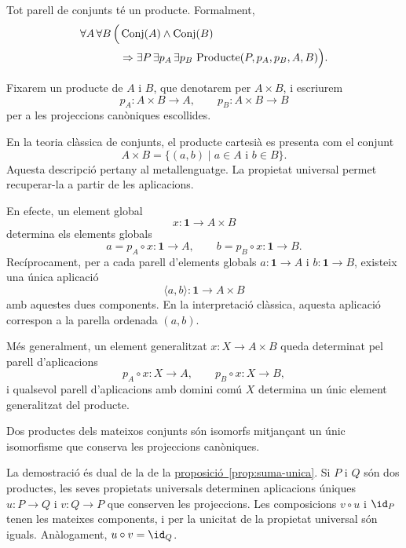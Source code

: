 \begin{axioma}\label{ax:productes}
Tot parell de conjunts té un producte. Formalment,
\[
\begin{aligned}
\forall A\,\forall B\,\Bigl(&
\operatorname{Conj}(A)\land\operatorname{Conj}(B)
\\
&{}\Rightarrow
\exists P\,\exists p_A\,\exists p_B\,
\operatorname{Producte}(P,p_A,p_B,A,B)
\Bigr).
\end{aligned}
\]
\end{axioma}

\begin{notacio}\label{not:producte-escollit}
Fixarem un producte de \(A\) i \(B\), que denotarem per \(A\times B\), i escriurem
\[
p_A:A\times B\to A,
\qquad
p_B:A\times B\to B
\]
per a les projeccions canòniques escollides.
\end{notacio}

\begin{observacio}\label{obs:parelles-ordenades}
En la teoria clàssica de conjunts, el producte cartesià es presenta com el conjunt
\[
A\times B=\{(a,b)\mid a\in A\text{ i }b\in B\}.
\]
Aquesta descripció pertany al metallenguatge. La propietat universal permet recuperar-la a partir de les aplicacions.

En efecte, un element global
\[
x:\mathbf1\to A\times B
\]
determina els elements globals
\[
a=p_A\circ x:\mathbf1\to A,
\qquad
b=p_B\circ x:\mathbf1\to B.
\]
Recíprocament, per a cada parell d'elements globals \(a:\mathbf1\to A\) i \(b:\mathbf1\to B\), existeix una única aplicació
\[
\langle a,b\rangle:\mathbf1\to A\times B
\]
amb aquestes dues components. En la interpretació clàssica, aquesta aplicació correspon a la parella ordenada \((a,b)\).

Més generalment, un element generalitzat \(x:X\to A\times B\) queda determinat pel parell d'aplicacions
\[
p_A\circ x:X\to A,
\qquad
p_B\circ x:X\to B,
\]
i qualsevol parell d'aplicacions amb domini comú \(X\) determina un únic element generalitzat del producte.
\end{observacio}

\begin{proposicio}\label{prop:producte-unic}
Dos productes dels mateixos conjunts són isomorfs mitjançant un únic isomorfisme que conserva les projeccions canòniques.
\end{proposicio}

\begin{prova}
La demostració és dual de la de la \hyperref[prop:suma-unica]{proposició~\ref*{prop:suma-unica}}. Si \(P\) i \(Q\) són dos productes, les seves propietats universals determinen aplicacions úniques \(u:P\to Q\) i \(v:Q\to P\) que conserven les projeccions. Les composicions \(v\circ u\) i \(\id_P\) tenen les mateixes components, i per la unicitat de la propietat universal són iguals. Anàlogament, \(u\circ v=\id_Q\).
\end{prova}

